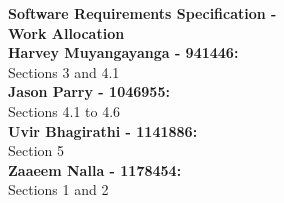 \documentclass{article}
\begin{document}
\textbf{\huge Software Requirements Specification - }\\
\textbf{\huge Work Allocation}
\bigskip
\bigskip\\

\textbf{Harvey Muyangayanga - 941446:}\\
	Sections 3 and 4.1 
\bigskip\\
\textbf{Jason Parry - 1046955:}\\
	Sections 4.1 to 4.6	
\bigskip\\	
\textbf{Uvir Bhagirathi - 1141886:}\\
	Section 5
\bigskip\\
\textbf{Zaaeem Nalla - 1178454:}\\
	Sections 1 and 2		
\end{document}
